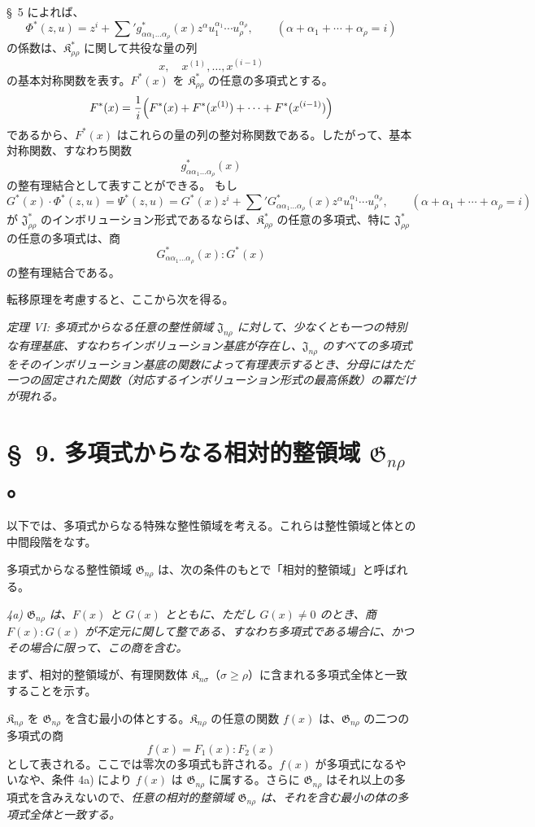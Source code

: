 \documentclass[11pt]{jlreq}
\providecommand{\Kfield}{\mathfrak{K}}
\providecommand{\Jdom}{\mathfrak{J}}
\providecommand{\Gdom}{\mathfrak{G}}
\begin{document}
\S\ 5 によれば、
\[
  \Phi^*(z,u)=z^i+\sum{}' g^*_{\alpha\alpha_1\ldots\alpha_\rho}(x)
  z^\alpha u_1^{\alpha_1}\cdots u_\rho^{\alpha_\rho},
  \qquad
  (\alpha+\alpha_1+\cdots+\alpha_\rho=i)
\]
の係数は、$\Kfield^*_{\rho\rho}$ に関して共役な量の列
\[
  x,\quad x^{(1)},\ldots,x^{(i-1)}
\]
の基本対称関数を表す。$F^*(x)$ を $\Kfield^*_{\rho\rho}$ の任意の多項式とする。
\[
  F^*(x)=\frac1i\Bigl(F^*(x)+F^*(x^{(1)})+
  \cdots+F^*(x^{(i-1)})\Bigr)
\]
であるから、$F^*(x)$ はこれらの量の列の整対称関数である。したがって、基本対称関数、すなわち関数
\[
  g^*_{\alpha\alpha_1\ldots\alpha_\rho}(x)
\]
の整有理結合として表すことができる。
もし
\[
  G^*(x)\cdot\Phi^*(z,u)=\Psi^*(z,u)
  =G^*(x)z^i+
  \sum{}'G^*_{\alpha\alpha_1\ldots\alpha_\rho}(x)
  z^\alpha u_1^{\alpha_1}\cdots u_\rho^{\alpha_\rho},
  \qquad
  (\alpha+\alpha_1+\cdots+\alpha_\rho=i)
\]
が $\Jdom^*_{\rho\rho}$ のインボリューション形式であるならば、$\Kfield^*_{\rho\rho}$ の任意の多項式、特に $\Jdom^*_{\rho\rho}$ の任意の多項式は、商
\[
  G^*_{\alpha\alpha_1\ldots\alpha_\rho}(x):G^*(x)
\]
の整有理結合である。

転移原理を考慮すると、ここから次を得る。

\emph{定理 VI: 多項式からなる任意の整性領域 $\Jdom_{n\rho}$ に対して、少なくとも一つの特別な有理基底、すなわちインボリューション基底が存在し、$\Jdom_{n\rho}$ のすべての多項式をそのインボリューション基底の関数によって有理表示するとき、分母にはただ一つの固定された関数（対応するインボリューション形式の最高係数）の冪だけが現れる。}

\section*{\S\ 9. 多項式からなる相対的整領域 $\Gdom_{n\rho}$。}

以下では、多項式からなる特殊な整性領域を考える。これらは整性領域と体との中間段階をなす。

多項式からなる整性領域 $\Gdom_{n\rho}$ は、次の条件のもとで「相対的整領域」と呼ばれる。

\emph{4a) $\Gdom_{n\rho}$ は、$F(x)$ と $G(x)$ とともに、ただし $G(x)\ne0$ のとき、商 $F(x):G(x)$ が不定元に関して整である、すなわち多項式である場合に、かつその場合に限って、この商を含む。}

まず、相対的整領域が、有理関数体 $\Kfield_{n\sigma}$（$\sigma\ge\rho$）に含まれる多項式全体と一致することを示す。

$\Kfield_{n\rho}$ を $\Gdom_{n\rho}$ を含む最小の体とする。$\Kfield_{n\rho}$ の任意の関数 $f(x)$ は、$\Gdom_{n\rho}$ の二つの多項式の商
\[
  f(x)=F_1(x):F_2(x)
\]
として表される。ここでは零次の多項式も許される。$f(x)$ が多項式になるやいなや、条件 4a) により $f(x)$ は $\Gdom_{n\rho}$ に属する。さらに $\Gdom_{n\rho}$ はそれ以上の多項式を含みえないので、\emph{任意の相対的整領域 $\Gdom_{n\rho}$ は、それを含む最小の体の多項式全体と一致する。}
\end{document}
